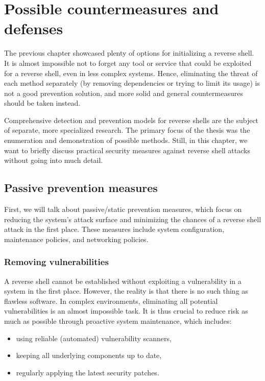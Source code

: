 \chapter{Possible countermeasures and defenses}

\label{chap:countermeasures}

The previous chapter showcased plenty of options for initializing a reverse shell. It is almost impossible not to forget any tool or service that could be exploited for a reverse shell, even in less complex systems. Hence, eliminating the threat of each method separately (by removing dependencies or trying to limit its usage) is not a good prevention solution, and more solid and general countermeasures should be taken instead.

Comprehensive detection and prevention models for reverse shells are the subject of separate, more specialized research. The primary focus of the thesis was the enumeration and demonstration of possible methods. Still, in this chapter, we want to briefly discuss practical security measures against reverse shell attacks without going into much detail.

\section{Passive prevention measures}

First, we will talk about passive/static prevention measures, which focus on reducing the system’s attack surface and minimizing the chances of a reverse shell attack in the first place. These measures include system configuration, maintenance policies, and networking policies.


\subsection{Removing vulnerabilities}

A reverse shell cannot be established without exploiting a vulnerability in a system in the first place. However, the reality is that there is no such thing as flawless software. In complex environments, eliminating all potential vulnerabilities is an almost impossible task. It is thus crucial to reduce risk as much as possible through proactive system maintenance, which includes:

\begin{itemize}
\item using reliable (automated) vulnerability scanners,
\item keeping all underlying components up to date,
\item regularly applying the latest security patches.
\end{itemize}

